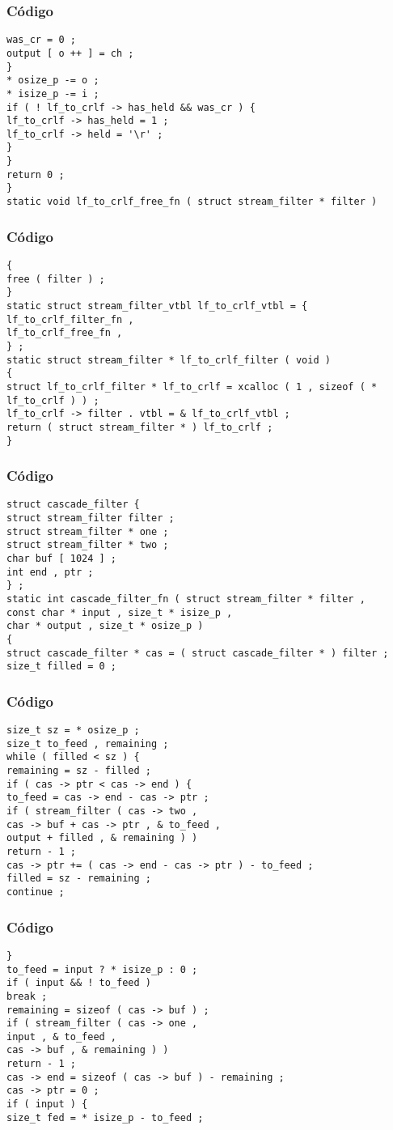 \documentclass{beamer}
\begin{document}
\begin{frame}[fragile]
\frametitle{C\'odigo}
\begin{verbatim}
was_cr = 0 ; 
output [ o ++ ] = ch ; 
} 
* osize_p -= o ; 
* isize_p -= i ; 
if ( ! lf_to_crlf -> has_held && was_cr ) { 
lf_to_crlf -> has_held = 1 ; 
lf_to_crlf -> held = '\r' ; 
} 
} 
return 0 ; 
} 
static void lf_to_crlf_free_fn ( struct stream_filter * filter ) 
\end{verbatim}
\end{frame}
\begin{frame}[fragile]
\frametitle{C\'odigo}
\begin{verbatim}
{ 
free ( filter ) ; 
} 
static struct stream_filter_vtbl lf_to_crlf_vtbl = { 
lf_to_crlf_filter_fn , 
lf_to_crlf_free_fn , 
} ; 
static struct stream_filter * lf_to_crlf_filter ( void ) 
{ 
struct lf_to_crlf_filter * lf_to_crlf = xcalloc ( 1 , sizeof ( * lf_to_crlf ) ) ; 
lf_to_crlf -> filter . vtbl = & lf_to_crlf_vtbl ; 
return ( struct stream_filter * ) lf_to_crlf ; 
} 
\end{verbatim}
\end{frame}
\begin{frame}[fragile]
\frametitle{C\'odigo}
\begin{verbatim}
struct cascade_filter { 
struct stream_filter filter ; 
struct stream_filter * one ; 
struct stream_filter * two ; 
char buf [ 1024 ] ; 
int end , ptr ; 
} ; 
static int cascade_filter_fn ( struct stream_filter * filter , 
const char * input , size_t * isize_p , 
char * output , size_t * osize_p ) 
{ 
struct cascade_filter * cas = ( struct cascade_filter * ) filter ; 
size_t filled = 0 ; 
\end{verbatim}
\end{frame}
\begin{frame}[fragile]
\frametitle{C\'odigo}
\begin{verbatim}
size_t sz = * osize_p ; 
size_t to_feed , remaining ; 
while ( filled < sz ) { 
remaining = sz - filled ; 
if ( cas -> ptr < cas -> end ) { 
to_feed = cas -> end - cas -> ptr ; 
if ( stream_filter ( cas -> two , 
cas -> buf + cas -> ptr , & to_feed , 
output + filled , & remaining ) ) 
return - 1 ; 
cas -> ptr += ( cas -> end - cas -> ptr ) - to_feed ; 
filled = sz - remaining ; 
continue ; 
\end{verbatim}
\end{frame}
\begin{frame}[fragile]
\frametitle{C\'odigo}
\begin{verbatim}
} 
to_feed = input ? * isize_p : 0 ; 
if ( input && ! to_feed ) 
break ; 
remaining = sizeof ( cas -> buf ) ; 
if ( stream_filter ( cas -> one , 
input , & to_feed , 
cas -> buf , & remaining ) ) 
return - 1 ; 
cas -> end = sizeof ( cas -> buf ) - remaining ; 
cas -> ptr = 0 ; 
if ( input ) { 
size_t fed = * isize_p - to_feed ; 
\end{verbatim}
\end{frame}
\end{document}
